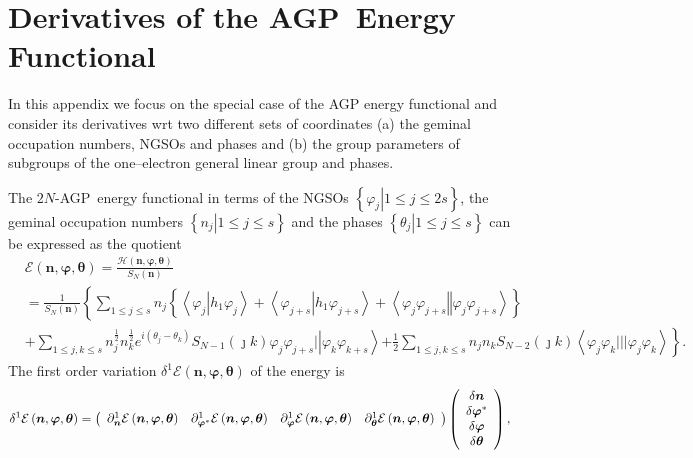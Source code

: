\documentclass[aps,preprint]{revtex4}%
\begin{document}
\section{Derivatives of the AGP\ Energy Functional\label{variational}}

In this appendix we focus on the special case of the AGP energy functional and
consider its derivatives wrt two different sets of coordinates (a) the geminal
occupation numbers, NGSOs and phases and (b) the group parameters of subgroups
of the one--electron general linear group and phases.

The $2N$-AGP\ energy functional in terms of the NGSOs $\left\{  \left.
\varphi_{j}\right\vert 1\leq j\leq2s\right\}  $, the geminal occupation
numbers $\left\{  \left.  n_{j}\right\vert 1\leq j\leq s\right\}  $ and the
phases $\left\{  \left.  \theta_{j}\right\vert 1\leq j\leq s\right\}  $ can be
expressed as the quotient%
\begin{align}
&  \mathcal{E}\left(  \bm{n},\bm{\varphi},\bm{\theta}\right)  =\frac
{\mathcal{H}\left(  \bm{n},\bm{\varphi},\bm{\theta}\right)  }{S_{N}\left(
\bm{n}\right)  }\nonumber\\
&  =\frac{1}{S_{N}\left(  \bm{n}\right)  }\left\{  \sum_{1\leq j\leq s}%
n_{j}\left\{  \left\langle \varphi_{j}\left\vert h_{1}\varphi_{j}\right.
\right\rangle +\left\langle \varphi_{j+s}\left\vert h_{1}\varphi_{j+s}\right.
\right\rangle +\left\langle \varphi_{j}\varphi_{j+s}\left\Vert \varphi
_{j}\varphi_{j+s}\right.  \right\rangle \right\}  \right. \nonumber\\
&  +\sum_{1\leq j,k\leq s}n_{j}^{\frac{1}{2}}n_{k}^{\frac{1}{2}}e^{i\left(
\theta_{j}-\theta_{k}\right)  }S_{N-1}\left(  \jmath k\right)  \varphi
_{j}\varphi_{j+s}|\left\vert \varphi_{k}\varphi_{k+s}\right\rangle \left.
+\frac{1}{2}\sum_{1\leq j,k\leq s}n_{j}n_{k}S_{N-2}\left(  \jmath k\right)
\left\langle \varphi_{j}\varphi_{k}|||\varphi_{j}\varphi_{k}\right\rangle
\right\}  .
\end{align}
The first order variation $\delta^{1}\mathcal{E}\left(
\bm{n},\bm{\varphi},\bm{\theta}\right)  $ of the energy is
\begin{equation}
\delta^{1}\mathcal{E}\left(  \bm{n},\bm{\varphi},\bm{\theta }\right)  =\left(
%
\begin{array}
[c]{cccc}%
\partial_{\bm{n}}^{1}\mathcal{E}\left(
\bm{n},\bm{\varphi },\bm{\theta}\right)  & \partial_{\bm{\varphi}^{\ast}}%
^{1}\mathcal{E}\left(  \bm{n},\bm{\varphi},\bm{\theta}\right)  &
\partial_{\bm{\varphi}}^{1}\mathcal{E}\left(
\bm{n},\bm{\varphi },\bm{\theta}\right)  & \partial_{\bm{\theta}}%
^{1}\mathcal{E}\left(  \bm{n},\bm{\varphi},\bm{\theta}\right)
\end{array}
\right)  \left(
\begin{array}
[c]{c}%
\delta\bm{n}\\
\delta\bm{\varphi}^{\ast}\\
\delta\bm{\varphi}\\
\delta\bm{\theta}
\end{array}
\right)  ,
\end{equation}
\end{document}
